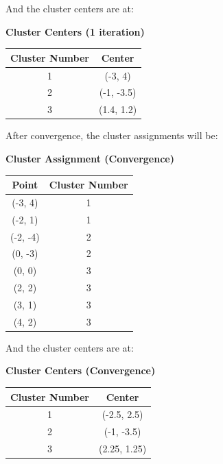 \documentclass{article}
\begin{document}
\begin{enumerate}
\begin{enumerate}
        And the cluster centers are at:
        \begin{center}
            \textbf{Cluster Centers (1 iteration)} \\
            \begin{tabular}{|c|c|}
            \hline
            Cluster Number & Center \\
            \hline
            1 & (-3, 4) \\
            \hline
            2 & (-1, -3.5) \\
            \hline
            3 & (1.4, 1.2) \\
            \hline
            \end{tabular}
        \end{center}

        After convergence, the cluster assignments will be:
        \begin{center}
            \textbf{Cluster Assignment (Convergence)} \\
            \begin{tabular}{|c|c|}
            \hline
            Point & Cluster Number \\
            \hline
            (-3, 4) & 1 \\
            \hline
            (-2, 1) & 1 \\
            \hline
            (-2, -4) & 2 \\
            \hline
            (0, -3) & 2 \\
            \hline
            (0, 0) & 3 \\
            \hline
            (2, 2) & 3 \\
            \hline
            (3, 1) & 3 \\
            \hline
            (4, 2) & 3 \\
            \hline
            \end{tabular}
        \end{center}

        And the cluster centers are at:
        \begin{center}
            \textbf{Cluster Centers (Convergence)} \\
            \begin{tabular}{|c|c|}
            \hline
            Cluster Number & Center \\
            \hline
            1 & (-2.5, 2.5) \\
            \hline
            2 & (-1, -3.5) \\
            \hline
            3 & (2.25, 1.25) \\
            \hline
            \end{tabular}
        \end{center}


\end{enumerate}
\end{enumerate}
\end{document}
